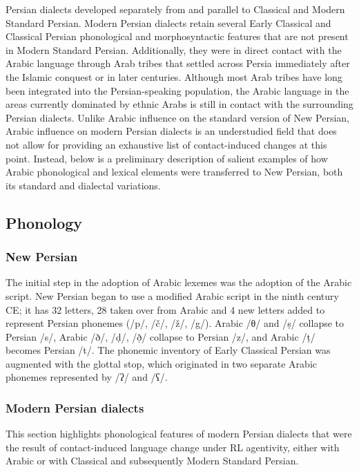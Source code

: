 \documentclass[output=paper]{langsci/langscibook}
\begin{document}
Persian dialects developed separately from and parallel to Classical and Modern Standard Persian. Modern Persian dialects retain several Early Classical and Classical Persian phonological and morphosyntactic features that are not present in Modern Standard Persian. Additionally, they were in direct contact with the Arabic language through Arab tribes that settled across Persia immediately after the Islamic conquest or in later centuries. Although most Arab tribes have long been integrated into the Persian-speaking population, the Arabic language in the areas currently dominated by ethnic Arabs is still in contact with the surrounding Persian dialects. Unlike Arabic influence on the standard version of New Persian, Arabic influence on modern Persian dialects is an understudied field that does not allow for providing an exhaustive list of contact-induced changes at this point. Instead, below is a preliminary description of salient examples of how Arabic phonological and lexical elements were transferred to New Persian, both its standard and dialectal variations.

\subsection{Phonology}


\subsubsection{New Persian}

The initial step in the adoption of Arabic lexemes was the adoption of the Arabic script. New Persian began to use a modified Arabic script in the ninth century CE; it has 32 letters, 28 taken over from Arabic and 4 new letters added to represent Persian phonemes (/p/, /č/, /ž/, /g/). Arabic /θ/ and /ṣ/ collapse to Persian /s/, Arabic /ð/, /ḍ/, /ð̣/ collapse to Persian /z/, and Arabic /ṭ/ becomes Persian /t/. The phonemic inventory of Early Classical Persian was augmented with the glottal stop, which originated in two separate Arabic phonemes represented by /ʔ/ and /ʕ/.

\subsubsection{Modern Persian dialects}

This section highlights phonological features of modern Persian dialects that were the result of contact-induced language change under RL agentivity, either with Arabic or with Classical and subsequently Modern Standard Persian.
\end{document}
